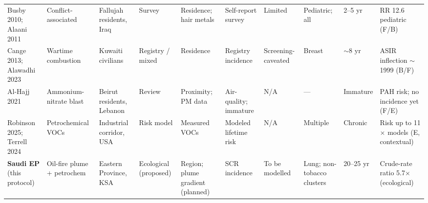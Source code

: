 \documentclass[11pt]{article}
\begin{document}
\begin{table}
\begin{tabular}{@{}L{0.10\textwidth}L{0.10\textwidth}L{0.09\textwidth}L{0.07\textwidth}L{0.10\textwidth}L{0.09\textwidth}L{0.09\textwidth}L{0.08\textwidth}L{0.06\textwidth}L{0.10\textwidth}@{}}
Busby 2010; Alaani 2011 & Conflict-associated & Fallujah residents, Iraq & Survey & Residence; hair metals & Self-report survey & Limited & Pediatric; all & 2--5 yr & RR 12.6 pediatric (F/B) \\
Cange 2013; Alawadhi 2023 & Wartime combustion & Kuwaiti civilians & Registry / mixed & Residence & Registry incidence & Screening-caveated & Breast & $\sim$8 yr & ASIR inflection $\sim$1999 (B/F) \\
Al-Hajj 2021 & Ammonium-nitrate blast & Beirut residents, Lebanon & Review & Proximity; PM data & Air-quality; immature & N/A & --- & Immature & PAH risk; no incidence yet (F/E) \\
Robinson 2025; Terrell 2024 & Petrochemical VOCs & Industrial corridor, USA & Risk model & Measured VOCs & Modeled lifetime risk & N/A & Multiple & Chronic & Risk up to 11$\times$ models (E, contextual) \\
\textbf{Saudi EP} (this protocol) & Oil-fire plume + petrochem & Eastern Province, KSA & Ecological (proposed) & Region; plume gradient (planned) & SCR incidence & To be modelled & Lung; non-tobacco clusters & 20--25 yr & Crude-rate ratio 5.7$\times$ (ecological) \\
\bottomrule
\end{tabular}
\end{table}
\end{document}
